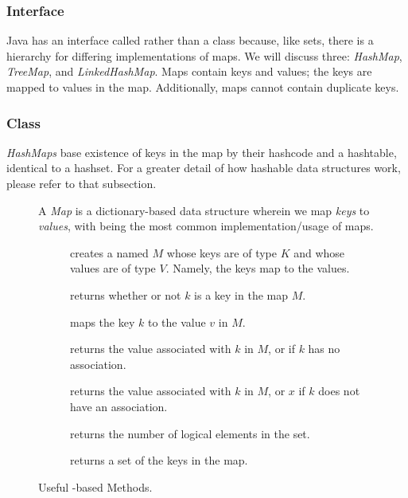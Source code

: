 \subsubsection*{ Interface}
Java has an interface called  rather than a class because, like sets, there is a hierarchy for differing implementations of maps. We will discuss three: \emph{HashMap}, \emph{TreeMap}, and \emph{LinkedHashMap}. Maps contain keys and values; the keys are mapped to values in the map. Additionally, maps cannot contain duplicate keys.

\subsubsection*{ Class}
\emph{HashMaps} base existence of keys in the map by their hashcode and a hashtable, identical to a hashset. For a greater detail of how hashable data structures work, please refer to that subsection.
\begin{figure}[tp]
  \small
  \begin{tcolorbox}[title=Java Maps]
    A \emph{Map} is a dictionary-based data structure wherein we map \emph{keys} to \emph{values}, with  being the most common implementation/usage of maps.
    \vspace{2ex}
  \begin{description}
    \item [] creates a  named $M$ whose keys are of type $K$ and whose values are of type $V$. Namely, the keys map to the values.
     \item [] returns whether or not $k$ is a key in the map $M$.
     \item [] maps the key $k$ to the value $v$ in $M$.
     \item [] returns the value associated with $k$ in $M$, or  if $k$ has no association.
     \item [] returns the value associated with $k$ in $M$, or $x$ if $k$ does not have an association.
    \item [] returns the number of logical elements in the set.
    \item [] returns a set of the keys in the map.
  \end{description}
\end{tcolorbox}
  \caption{Useful -based Methods.}
  \label{fig:hashmap}
\end{figure}

